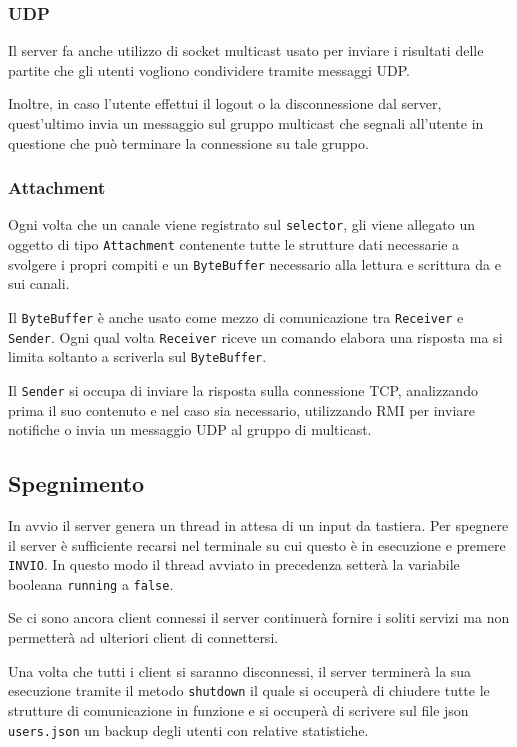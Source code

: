 \subsubsection{UDP}
Il server fa anche utilizzo di socket multicast usato per inviare i risultati delle partite che
gli utenti vogliono condividere tramite messaggi UDP.

Inoltre, in caso l'utente effettui il logout o la disconnessione dal server, quest'ultimo invia
un messaggio sul gruppo multicast che segnali all'utente in questione che può terminare la
connessione su tale gruppo.

\subsubsection{Attachment}
Ogni volta che un canale viene registrato sul \verb|selector|, gli viene allegato un oggetto di
tipo \verb|Attachment| contenente tutte le strutture dati necessarie a svolgere i propri compiti
e un \verb|ByteBuffer| necessario alla lettura e scrittura da e sui canali.

Il \verb|ByteBuffer| è anche usato come mezzo di comunicazione tra \verb|Receiver| e
\verb|Sender|. Ogni qual volta \verb|Receiver| riceve un comando elabora una risposta ma si limita
soltanto a scriverla sul \verb|ByteBuffer|.

Il \verb|Sender| si occupa di inviare la risposta sulla connessione TCP, analizzando prima il suo
contenuto e nel caso sia necessario, utilizzando RMI per inviare notifiche o invia un messaggio
UDP al gruppo di multicast.

\subsection{Spegnimento}
In avvio il server genera un thread in attesa di un input da tastiera. Per spegnere il server è
sufficiente recarsi nel terminale su cui questo è in esecuzione e premere \verb|INVIO|. In questo
modo il thread avviato in precedenza setterà la variabile booleana \verb|running| a \verb|false|.

Se ci sono ancora client connessi il server continuerà fornire i soliti servizi ma non permetterà
ad ulteriori client di connettersi.

Una volta che tutti i client si saranno disconnessi, il server terminerà la sua esecuzione tramite
il metodo \verb|shutdown| il quale si occuperà di chiudere tutte le strutture di comunicazione
in funzione e si occuperà di scrivere sul file json \verb|users.json| un backup degli utenti con
relative statistiche.